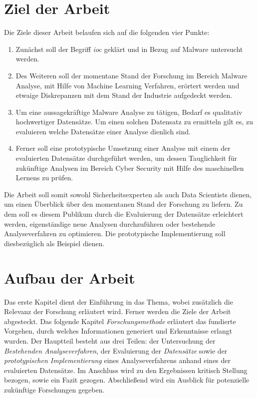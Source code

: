 \documentclass[
    12pt, %
    DIV10,
    ngerman, %
    a4paper, %
    oneside, %
    titlepage, %
    parskip=half, %
    headings=normal, %
    listof=totoc, %
    bibliography=totoc, %
    index=totoc, %
    captions=tableheading, %
    final %
]{scrreprt}
\begin{document}
\section{Ziel der Arbeit}
Die Ziele dieser Arbeit belaufen sich auf die folgenden vier Punkte:
\begin{enumerate}
\item Zunächst soll der Begriff \emph{\acl{ioc}} geklärt und in Bezug auf Malware untersucht werden. 
\item Des Weiteren soll der momentane Stand der Forschung im Bereich Malware Analyse, mit Hilfe von Machine Learning Verfahren, erörtert werden und etwaige Diskrepanzen mit dem Stand der Industrie aufgedeckt werden.
\item Um eine aussagekräftige Malware Analyse zu tätigen, Bedarf es qualitativ hochwertiger Datensätze. Um einen solchen Datensatz zu ermitteln gilt es, zu evaluieren welche Datensätze einer Analyse dienlich sind.
\item Ferner soll eine prototypische Umsetzung einer Analyse mit einem der evaluierten Datensätze durchgeführt werden, um dessen Tauglichkeit für zukünftige Analysen im Bereich Cyber Security mit Hilfe des maschinellen Lernens zu prüfen.
\end{enumerate}
Die Arbeit soll somit sowohl Sicherheitsexperten als auch Data Scientists dienen, um einen Überblick über den momentanen Stand der Forschung zu liefern. Zu dem soll es diesem Publikum durch die Evaluierung der Datensätze erleichtert werden, eigenständige neue Analysen durchzuführen oder bestehende Analyseverfahren zu optimieren. Die prototypische Implementierung soll diesbezüglich als Beispiel dienen.
\section{Aufbau der Arbeit}
Das erste Kapitel dient der Einführung in das Thema, wobei zusätzlich die Relevanz der Forschung erläutert wird. Ferner werden die Ziele der Arbeit abgesteckt. Das folgende Kapitel \emph{Forschungsmethode} erläutert das fundierte Vorgehen, durch welches Informationen generiert und Erkenntnisse erlangt wurden. Der Hauptteil besteht aus drei Teilen: der Untersuchung der \emph{Bestehenden Analyseverfahren}, der Evaluierung der \emph{Datensätze} sowie der \emph{prototypischen Implementierung} eines Analyseverfahrens anhand eines der evaluierten Datensätze. Im Anschluss wird zu den  Ergebnissen kritisch Stellung bezogen, sowie ein Fazit gezogen. Abschließend wird ein Ausblick für potenzielle zukünftige Forschungen gegeben.
\end{document}
